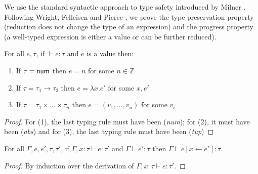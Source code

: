 We use the standard syntactic approach to type safety introduced by Milner \cite{syntactic-sml}.
Following Wright, Felleisen and Pierce \cite{syntactic-tapl,syntactic-approach}, we prove the
type preservation property (reduction does not change the type of an expression) and the progress
property (a well-typed expression is either a value or can be further reduced).

\begin{lemma}
\label{thm:semantics-fp-canon}
For all $e, \tau$, if $\vdash e : \tau$ and $e$ is a value then:
\begin{enumerate}
  \item If $\tau=\ident{num}$ then $e = n$ for some $n \in \mathbb{Z}$
  \item If $\tau=\tau_1 \rightarrow \tau_2$ then $e = \lambda x.e'$ for some $x, e'$
  \item If $\tau=\tau_1\times\ldots\times\tau_n$ then $e = (v_1, \ldots, v_n)$ for some $v_i$
\end{enumerate}
\end{lemma}
\begin{proof}
  For (1), the last typing rule must have been (\emph{num}); for (2), it must have been
  (\emph{abs}) and for (3), the last typing rule must have been (\emph{tup})
\end{proof}

\begin{lemma}
\label{thm:semantics-fp-pres-subst}
For all $\Gamma, e, e', \tau, \tau'$, if $\Gamma, x:\tau \vdash e : \tau'$ and $\Gamma \vdash e' : \tau$
then $\Gamma \vdash e[x \leftarrow e'] : \tau$.
\end{lemma}
\begin{proof}
By induction over the derivation of $\Gamma, x:\tau \vdash e : \tau'$.
\end{proof}

